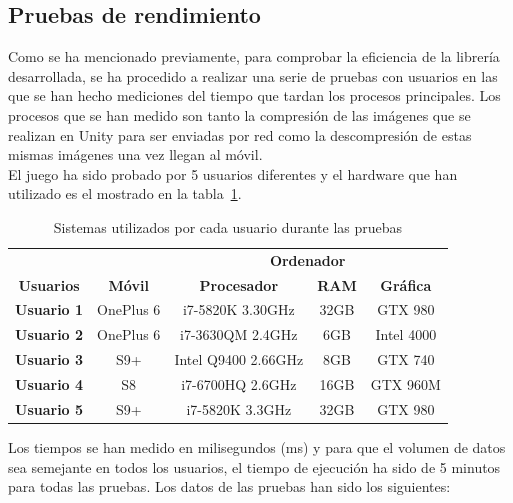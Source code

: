 \subsection{Pruebas de rendimiento}

Como se ha mencionado previamente, para comprobar la eficiencia de la librer\'ia desarrollada, se ha procedido a realizar una serie de pruebas con usuarios en las que se han hecho mediciones del tiempo que tardan los procesos principales. Los procesos que se han medido son tanto la compresi\'on de las im\'agenes que se realizan en Unity para ser enviadas por red como la descompresi\'on de estas mismas im\'agenes una vez llegan al m\'ovil.\\

El juego ha sido probado por 5 usuarios diferentes y el hardware que han utilizado es el mostrado en la tabla~\ref{tablausuarios}.

\begin{table}[h]
\centering
    \begin{tabular}{ccccc}
        \toprule
    & & \multicolumn{3}{c}{\textbf{Ordenador}}  \\
    \cmidrule(lr){3-5}
         \textbf{Usuarios} & \textbf{M\'ovil} & \textbf{Procesador} & \textbf{RAM} & \textbf{Gr\'afica} \\
        \midrule
\textbf{Usuario 1} & OnePlus 6 & i7-5820K 3.30GHz & 32GB &  GTX 980\\
\textbf{Usuario 2} & OnePlus 6 & i7-3630QM 2.4GHz & 6GB &  Intel 4000 \\
\textbf{Usuario 3} & S9+ & Intel Q9400 2.66GHz & 8GB &  GTX 740 \\
\textbf{Usuario 4} & S8 & i7-6700HQ 2.6GHz & 16GB & GTX 960M \\
\textbf{Usuario 5} & S9+ & i7-5820K 3.3GHz & 32GB &  GTX 980 \\
        \bottomrule
    \end{tabular}
\caption{Sistemas utilizados por cada usuario durante las pruebas}
\label{tablausuarios}
\end{table}

Los tiempos se han medido en milisegundos (ms) y para que el volumen de datos sea semejante en todos los usuarios, el tiempo de ejecuci\'on ha sido de 5 minutos para todas las pruebas. Los datos de las pruebas han sido los siguientes:

